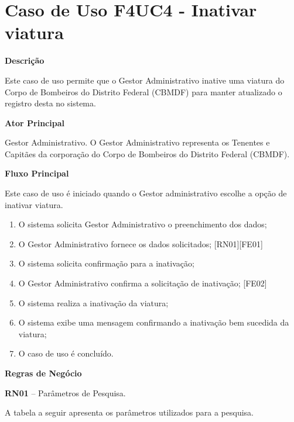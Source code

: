 
  \section{Caso de Uso F4UC4 - Inativar viatura}

  {\raggedright
      \textbf{Descrição}
  }

Este caso de uso permite que o Gestor Administrativo inative uma viatura do Corpo de Bombeiros do 
Distrito Federal (CBMDF)  para manter atualizado o registro desta no sistema.
    
  {\raggedright
      \textbf{Ator Principal}
  }

    Gestor Administrativo. O Gestor Administrativo representa os Tenentes e Capitães da corporação do Corpo de Bombeiros do Distrito
    Federal (CBMDF).

  {\raggedright
      \textbf{Fluxo Principal}
  }
  
Este caso de uso é iniciado quando o Gestor administrativo escolhe a opção de inativar viatura.

  \begin{enumerate}

\item O sistema solicita Gestor Administrativo o preenchimento dos dados; 
\item O Gestor Administrativo fornece os dados solicitados; [RN01][FE01]
\item O sistema solicita confirmação para a inativação;
\item O Gestor Administrativo confirma a solicitação de inativação; [FE02]
\item O sistema realiza a inativação da viatura;
\item O sistema exibe uma mensagem confirmando a inativação bem sucedida da viatura;
\item O caso de uso é concluído.
    
  \end{enumerate}
  
  
   {\raggedright
      \textbf{Regras de Negócio}
   }
   
                 
      \textbf{RN01} – Parâmetros de Pesquisa.
   
A tabela a seguir apresenta os parâmetros utilizados para a pesquisa.

